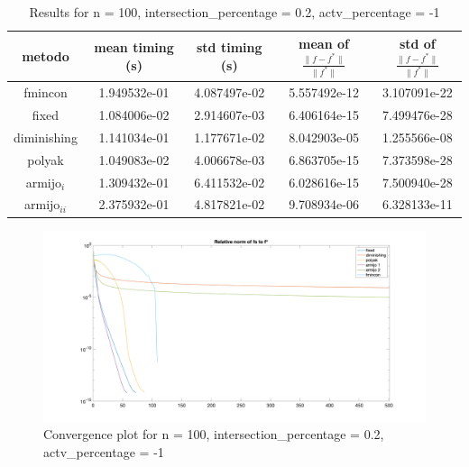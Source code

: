 \captionsetup{justification=centering}



\begin{table}[H]
\setlength{\tabcolsep}{10pt} %
\renewcommand{\arraystretch}{1.2} %
\centering
\begin{tabular}{|ccccc|}
\hline
\multicolumn{1}{|c||}{metodo}   & \multicolumn{1}{c|}{mean timing (s)}    & \multicolumn{1}{c|}{std timing (s)} & \multicolumn{1}{c|}{mean of $\frac{\|f - f^*\|}{\|f^*\|}$}   & std of $\frac{\|f - f^*\|}{\|f^*\|}$ \\ \hline\hline
\multicolumn{1}{|c||}{fmincon} & \multicolumn{1}{c|}{1.949532e-01} & \multicolumn{1}{c|}{4.087497e-02}  & \multicolumn{1}{c|}{5.557492e-12} & 3.107091e-22 \\ \hline\hline
\multicolumn{1}{|c||}{fixed}       & \multicolumn{1}{c|}{1.084006e-02} & \multicolumn{1}{c|}{2.914607e-03}  & \multicolumn{1}{c|}{6.406164e-15} & 7.499476e-28  \\ \hline
\multicolumn{1}{|c||}{diminishing} & \multicolumn{1}{c|}{1.141034e-01} & \multicolumn{1}{c|}{1.177671e-02}  & \multicolumn{1}{c|}{8.042903e-05} & 1.255566e-08 \\ \hline
\multicolumn{1}{|c||}{polyak} & \multicolumn{1}{c|}{1.049083e-02} & \multicolumn{1}{c|}{4.006678e-03}  & \multicolumn{1}{c|}{6.863705e-15} & 7.373598e-28 \\ \hline
\multicolumn{1}{|c||}{armijo$_i$} & \multicolumn{1}{c|}{1.309432e-01} & \multicolumn{1}{c|}{6.411532e-02}  & \multicolumn{1}{c|}{6.028616e-15} & 7.500940e-28 \\ \hline
\multicolumn{1}{|c||}{armijo$_{ii}$} & \multicolumn{1}{c|}{2.375932e-01} & \multicolumn{1}{c|}{4.817821e-02}  & \multicolumn{1}{c|}{9.708934e-06} & 6.328133e-11 \\ \hline
\end{tabular}
\caption{Results for n = 100, intersection\_percentage = 0.2, actv\_percentage = -1}
\label{tab:100_menouno_zerodue}
\end{table}


\begin{figure}[H]
\centering
    \includegraphics[width=20cm, center]{./plots/plot_100_menouno_zerodue.png}
    \caption{Convergence plot for n = 100, intersection\_percentage = 0.2, actv\_percentage = -1}
    \label{fig:100_menouno_zerodue}
\end{figure} 





